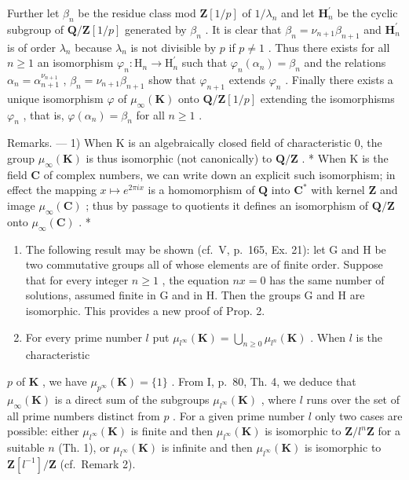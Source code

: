 Further let \(\beta_{n}\) be the residue class mod \(\mathbf{Z}[1/p]\) of \(1/\lambda_{n}\) and let \(\mathbf{H}_{n}^{\prime}\) be the cyclic subgroup of \(\mathbf{Q}/\mathbf{Z}[1/p]\) generated by \(\beta_{n}\) . It is clear that \(\beta_{n} = \nu_{n+1}\beta_{n+1}\) and \(\mathbf{H}_{n}^{\prime}\) is of order \(\lambda_{n}\) because \(\lambda_{n}\) is not divisible by \(p\) if \(p \neq 1\) . Thus there exists for all \(n \geqslant 1\) an isomorphism \(\varphi_{n}: \mathrm{H}_{n} \to \mathrm{H}_{n}^{\prime}\) such that \(\varphi_{n}(\alpha_{n}) = \beta_{n}\) and the relations \(\alpha_{n} = \alpha_{n+1}^{\nu_{n+1}}\) , \(\beta_{n} = \nu_{n+1}\beta_{n+1}\) show that \(\varphi_{n+1}\) extends \(\varphi_{n}\) . Finally there exists a unique isomorphism \(\varphi\) of \(\mu_{\infty}(\mathbf{K})\) onto \(\mathbf{Q}/\mathbf{Z}[1/p]\) extending the isomorphisms \(\varphi_{n}\) , that is, \(\varphi(\alpha_{n}) = \beta_{n}\) for all \(n \geqslant 1\) .

Remarks. --- 1) When K is an algebraically closed field of characteristic 0, the group \(\mu_{\infty}(\mathbf{K})\) is thus isomorphic (not canonically) to \(\mathbf{Q}/\mathbf{Z}\) . * When K is the field \(\mathbf{C}\) of complex numbers, we can write down an explicit such isomorphism; in effect the mapping \(x \mapsto e^{2\pi ix}\) is a homomorphism of \(\mathbf{Q}\) into \(\mathbf{C}^*\) with kernel \(\mathbf{Z}\) and image \(\mu_{\infty}(\mathbf{C})\) ; thus by passage to quotients it defines an isomorphism of \(\mathbf{Q}/\mathbf{Z}\) onto \(\mu_{\infty}(\mathbf{C})\) . *

\begin{enumerate}
\def\labelenumi{\arabic{enumi})}
\setcounter{enumi}{1}
\item
  The following result may be shown (cf.~V, p.~165, Ex. 21): let G and H be two commutative groups all of whose elements are of finite order. Suppose that for every integer \(n \geqslant 1\) , the equation \(nx = 0\) has the same number of solutions, assumed finite in G and in H. Then the groups G and H are isomorphic. This provides a new proof of Prop. 2.
\item
  For every prime number \(l\) put \(\mu_{l^{\infty}}(\mathbf{K}) = \bigcup_{n\geqslant 0}\mu_{l^{n}}(\mathbf{K})\) . When \(l\) is the characteristic
\end{enumerate}

\(p\) of \(\mathbf{K}\) , we have \(\mu_{p^{\infty}}(\mathbf{K}) = \{1\}\) . From I, p.~80, Th. 4, we deduce that \(\mu_{\infty}(\mathbf{K})\) is a direct sum of the subgroups \(\mu_{l^{\infty}}(\mathbf{K})\) , where \(l\) runs over the set of all prime numbers distinct from \(p\) . For a given prime number \(l\) only two cases are possible: either \(\mu_{l^{\infty}}(\mathbf{K})\) is finite and then \(\mu_{l^{\infty}}(\mathbf{K})\) is isomorphic to \(\mathbf{Z}/l^{n}\mathbf{Z}\) for a suitable \(n\) (Th. 1), or \(\mu_{l^{\infty}}(\mathbf{K})\) is infinite and then \(\mu_{l^{\infty}}(\mathbf{K})\) is isomorphic to \(\mathbf{Z}[l^{-1}]/\mathbf{Z}\) (cf.~Remark 2).

